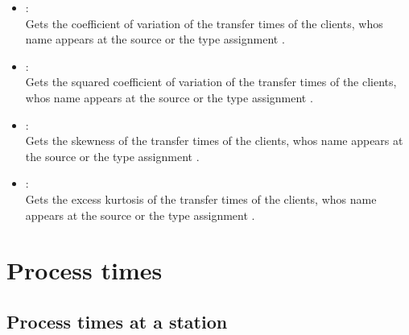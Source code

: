 \begin{itemize}
\item
{}:\\
Gets the coefficient of variation of the transfer times of the clients, whos name appears at the source or the type assignment .

\item
{}:\\
Gets the squared coefficient of variation of the transfer times of the clients, whos name appears at the source or the type assignment .

\item
{}:\\
Gets the skewness of the transfer times of the clients, whos name appears at the source or the type assignment .

\item
{}:\\
Gets the excess kurtosis of the transfer times of the clients, whos name appears at the source or the type assignment .

\end{itemize}



\section{Process times}



\subsection{Process times at a station}

